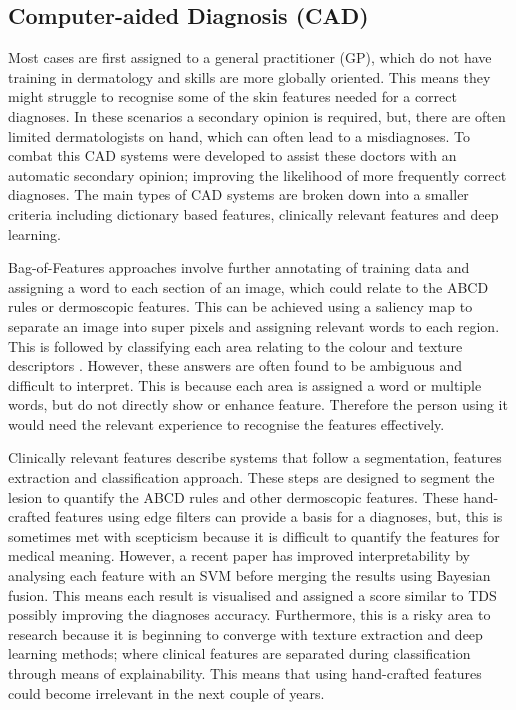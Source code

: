 \subsection{Computer-aided Diagnosis (CAD)}
Most cases are first assigned to a general practitioner (GP), which do not have training in dermatology and skills are more globally oriented. This means they might struggle to recognise some of the skin features needed for a correct diagnoses. In these scenarios a secondary opinion is required, but, there are often limited dermatologists on hand, which can often lead to a misdiagnoses. To combat this CAD systems were developed to assist these doctors with an automatic secondary opinion; improving the likelihood of more frequently correct diagnoses. The main types of CAD systems are broken down into a smaller criteria including dictionary based features, clinically relevant features and deep learning\cite{Barata2019}.

Bag-of-Features approaches involve further annotating of training data and assigning a word to each section of an image, which could relate to the ABCD rules or dermoscopic features. This can be achieved using a saliency map to separate an image into super pixels and assigning relevant words to each region. This is followed by classifying each area relating to the colour and texture descriptors \cite{Barata2013}. However, these answers are often found to be ambiguous and difficult to interpret. This is because each area is assigned a word or multiple words, but do not directly show or enhance feature. Therefore the person using it would need the relevant experience to recognise the features effectively.

Clinically relevant features describe systems that follow a segmentation, features extraction and classification\cite{Vocaturo2019} approach. These steps are designed to segment the lesion to quantify the ABCD rules\cite{Bakheet2017, Filali2019} and other dermoscopic features. These hand-crafted features using edge filters can provide a basis for a diagnoses, but, this is sometimes met with scepticism because it is difficult to quantify the features for medical meaning. However, a recent paper has improved interpretability by analysing each feature with an SVM before merging the results using Bayesian fusion. This means each result is visualised and assigned a score similar to TDS possibly improving the diagnoses accuracy. Furthermore, this is a risky area to research because it is beginning to converge with texture extraction and deep learning methods; where clinical features are separated during classification through means of explainability. This means that using hand-crafted features could become irrelevant in the next couple of years.

